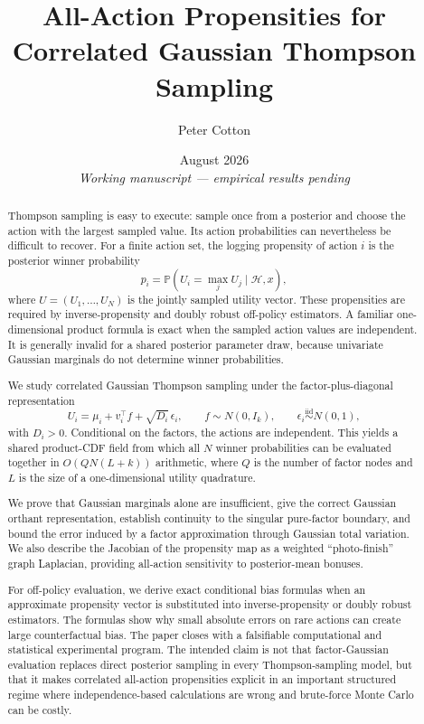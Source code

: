 \documentclass[11pt]{article}
\title{All-Action Propensities for Correlated Gaussian Thompson Sampling}
\author{Peter Cotton}
\date{August 2026\\[0.5em]\normalsize\emph{Working manuscript --- empirical results pending}}
\newcommand{\Prob}{\mathbb{P}}
\begin{document}
\maketitle

\begin{abstract}
Thompson sampling is easy to execute: sample once from a posterior and choose the action with the largest sampled value. Its action probabilities can nevertheless be difficult to recover. For a finite action set, the logging propensity of action $i$ is the posterior winner probability
\[
p_i = \Prob\!\left( U_i = \max_j U_j \mid \mathcal{H}, x \right),
\]
where $U = (U_1, \ldots, U_N)$ is the jointly sampled utility vector. These propensities are required by inverse-propensity and doubly robust off-policy estimators. A familiar one-dimensional product formula is exact when the sampled action values are independent. It is generally invalid for a shared posterior parameter draw, because univariate Gaussian marginals do not determine winner probabilities.

We study correlated Gaussian Thompson sampling under the factor-plus-diagonal representation
\[
U_i = \mu_i + v_i^\top f + \sqrt{D_i}\,\epsilon_i,
\qquad
f \sim N(0, I_k),
\qquad
\epsilon_i \stackrel{\mathrm{iid}}{\sim} N(0,1),
\]
with $D_i > 0$. Conditional on the factors, the actions are independent. This yields a shared product-CDF field from which all $N$ winner probabilities can be evaluated together in $O(QN(L+k))$ arithmetic, where $Q$ is the number of factor nodes and $L$ is the size of a one-dimensional utility quadrature.

We prove that Gaussian marginals alone are insufficient, give the correct Gaussian orthant representation, establish continuity to the singular pure-factor boundary, and bound the error induced by a factor approximation through Gaussian total variation. We also describe the Jacobian of the propensity map as a weighted ``photo-finish'' graph Laplacian, providing all-action sensitivity to posterior-mean bonuses.

For off-policy evaluation, we derive exact conditional bias formulas when an approximate propensity vector is substituted into inverse-propensity or doubly robust estimators. The formulas show why small absolute errors on rare actions can create large counterfactual bias. The paper closes with a falsifiable computational and statistical experimental program. The intended claim is not that factor-Gaussian evaluation replaces direct posterior sampling in every Thompson-sampling model, but that it makes correlated all-action propensities explicit in an important structured regime where independence-based calculations are wrong and brute-force Monte Carlo can be costly.
\end{abstract}
\end{document}
